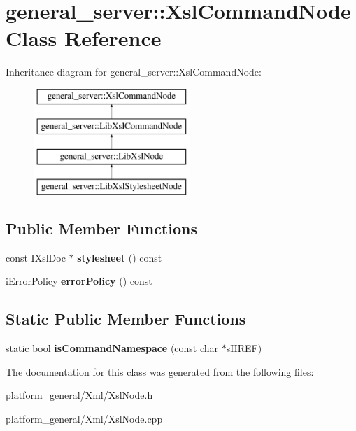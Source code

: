 \hypertarget{classgeneral__server_1_1XslCommandNode}{\section{general\-\_\-server\-:\-:\-Xsl\-Command\-Node \-Class \-Reference}
\label{classgeneral__server_1_1XslCommandNode}
}
\-Inheritance diagram for general\-\_\-server\-:\-:\-Xsl\-Command\-Node\-:\begin{figure}[H]
\begin{center}
\leavevmode
\includegraphics[height=4.000000cm]{classgeneral__server_1_1XslCommandNode}
\end{center}
\end{figure}
\subsection*{\-Public \-Member \-Functions}
\begin{DoxyCompactItemize}
\item 
\hypertarget{classgeneral__server_1_1XslCommandNode_a72633019af9aa773b230c0afe2ab93c8}{const \-I\-Xsl\-Doc $\ast$ {\bfseries stylesheet} () const }\label{classgeneral__server_1_1XslCommandNode_a72633019af9aa773b230c0afe2ab93c8}

\item 
\hypertarget{classgeneral__server_1_1XslCommandNode_a6a6ecaca6954a5f4fb20c641907ae110}{i\-Error\-Policy {\bfseries error\-Policy} () const }\label{classgeneral__server_1_1XslCommandNode_a6a6ecaca6954a5f4fb20c641907ae110}

\end{DoxyCompactItemize}
\subsection*{\-Static \-Public \-Member \-Functions}
\begin{DoxyCompactItemize}
\item 
\hypertarget{classgeneral__server_1_1XslCommandNode_aa5d012ec1cb481524bbfe040168c64bb}{static bool {\bfseries is\-Command\-Namespace} (const char $\ast$s\-H\-R\-E\-F)}\label{classgeneral__server_1_1XslCommandNode_aa5d012ec1cb481524bbfe040168c64bb}

\end{DoxyCompactItemize}


\-The documentation for this class was generated from the following files\-:\begin{DoxyCompactItemize}
\item 
platform\-\_\-general/\-Xml/\-Xsl\-Node.\-h\item 
platform\-\_\-general/\-Xml/\-Xsl\-Node.\-cpp\end{DoxyCompactItemize}
